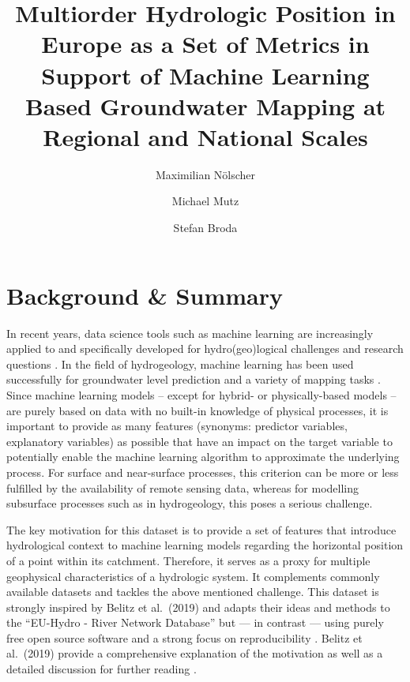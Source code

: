 \documentclass[fleqn,10pt]{wlscirep}
\title{Multiorder Hydrologic Position in Europe as a Set of Metrics in Support of Machine Learning Based Groundwater Mapping at Regional and National Scales}
\author[*, 1]{Maximilian Nölscher}
\author[2]{Michael Mutz}
\author[1]{Stefan Broda}
\affil[1]{Federal Institute for Geosciences and Natural Resources (BGR), Sub-Department: Basic information Groundwater and Soil (B2.2), Berlin, 13593, Germany}
\affil[2]{independent researcher}
\affil[*]{corresponding author: Maximilian Nölscher (max-n@posteo.de)}
\begin{document}
\flushbottom
\maketitle

\thispagestyle{empty}

\hypertarget{background-summary}{%
\section{Background \& Summary}\label{background-summary}}

In recent years, data science tools such as machine learning are increasingly applied to and specifically developed for hydro(geo)logical challenges and research questions \cite{zounemat-kermani_neurocomputing_2020}. In the field of hydrogeology, machine learning has been used successfully for groundwater level prediction and a variety of mapping tasks \cite{desimone_machine-learning_2020, knoll_large_2019, knoll_nation-wide_2020, mueller_surrogate_2019, stackelberg_machine_2021, wang_comparison_2016, wunsch_forecasting_2018, wunsch_groundwater_2020}. Since machine learning models -- except for hybrid- or physically-based models -- are purely based on data with no built-in knowledge of physical processes, it is important to provide as many features (synonyms: predictor variables, explanatory variables) as possible that have an impact on the target variable to potentially enable the machine learning algorithm to approximate the underlying process. For surface and near-surface processes, this criterion can be more or less fulfilled by the availability of remote sensing data, whereas for modelling subsurface processes such as in hydrogeology, this poses a serious challenge.

The key motivation for this dataset is to provide a set of features that introduce hydrological context to machine learning models regarding the horizontal position of a point within its catchment. Therefore, it serves as a proxy for multiple geophysical characteristics of a hydrologic system. It complements commonly available datasets and tackles the above mentioned challenge.
This dataset is strongly inspired by Belitz et al.~(2019) and adapts their ideas and methods to the ``EU-Hydro - River Network Database'' but --- in contrast --- using purely free open source software and a strong focus on reproducibility \cite{belitz_multiorder_2019}. Belitz et al.~(2019) provide a comprehensive explanation of the motivation as well as a detailed discussion for further reading \cite{belitz_multiorder_2019}.
\end{document}
